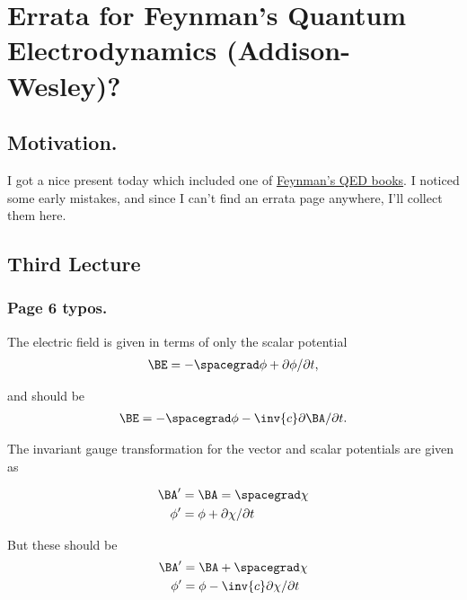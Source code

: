 
%

\chapter{Errata for Feynman's Quantum Electrodynamics (Addison-Wesley)?}
\label{chap:feynmanQEDerrata}
{}
\date{May 28, 2010}

\beginArtWithToc

\section{Motivation.}

I got a nice present today which included one of \href{http://www.amazon.com/Quantum-Electrodynamics-Advanced-Book-Classics/dp/0201360756/ref=sr_1_1?ie=UTF8&s=books&qid=1275092228&sr=8-1}{Feynman's QED books}.  I noticed some early mistakes, and since I can't find an errata page anywhere, I'll collect them here.

\section{Third Lecture}
\subsection{Page 6 typos.}

The electric field is given in terms of only the scalar potential
\begin{align*}
\BE = -\spacegrad \phi + \partial \phi/ \partial t,
\end{align*}

and should be
\begin{align*}
\BE = -\spacegrad \phi - \inv{c} \partial \BA/ \partial t.
\end{align*}

The invariant gauge transformation for the vector and scalar potentials are given as

\begin{align*}
\BA' &= \BA = \spacegrad \chi \\
\phi' &= \phi + \partial \chi / \partial t
\end{align*}

But these should be
\begin{align*}
\BA' &= \BA + \spacegrad \chi \\
\phi' &= \phi - \inv{c} \partial \chi / \partial t
\end{align*}

